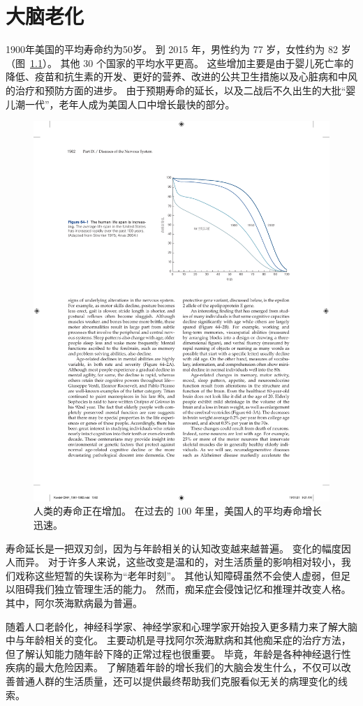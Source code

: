 \chapter{大脑老化} \label{chap:chap64}

1900年美国的平均寿命约为50岁。
到 2015 年，男性约为 77 岁，女性约为 82 岁（图~\ref{fig:64_1}）。
其他 30 个国家的平均水平更高。
这些增加主要是由于婴儿死亡率的降低、疫苗和抗生素的开发、更好的营养、改进的公共卫生措施以及心脏病和中风的治疗和预防方面的进步。
由于预期寿命的延长，以及二战后不久出生的大批“婴儿潮一代”，老年人成为美国人口中增长最快的部分。


\begin{figure}[htbp]
	\centering
	\includegraphics[width=0.75\linewidth]{chap64/fig_64_1}
	\caption{人类的寿命正在增加。
		在过去的 100 年里，美国人的平均寿命增长迅速\cite{strehler1975implications,arias2007united}。}
	\label{fig:64_1}
\end{figure}


寿命延长是一把双刃剑，因为与年龄相关的认知改变越来越普遍。
变化的幅度因人而异。
对于许多人来说，这些改变是温和的，对生活质量的影响相对较小，我们戏称这些短暂的失误称为“老年时刻”。
其他认知障碍虽然不会使人虚弱，但足以阻碍我们独立管理生活的能力。
然而，痴呆症会侵蚀记忆和推理并改变人格。
其中，阿尔茨海默病最为普遍。


随着人口老龄化，神经科学家、神经学家和心理学家开始投入更多精力来了解大脑中与年龄相关的变化。
主要动机是寻找阿尔茨海默病和其他痴呆症的治疗方法，但了解认知能力随年龄下降的正常过程也很重要。
毕竟，年龄是各种神经退行性疾病的最大危险因素。
了解随着年龄的增长我们的大脑会发生什么，不仅可以改善普通人群的生活质量，还可以提供最终帮助我们克服看似无关的病理变化的线索。


